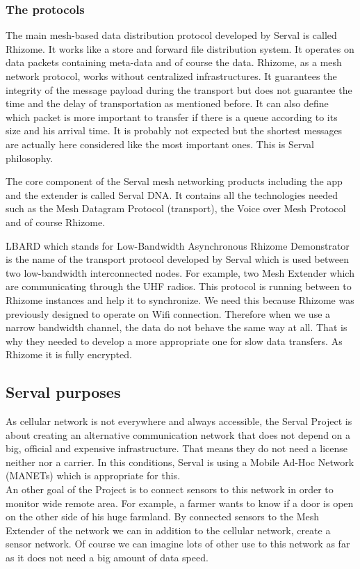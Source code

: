 \subsubsection{The protocols}

\par
The main mesh-based data distribution protocol developed by Serval is called Rhizome. It works like a store and forward file distribution system. It operates on data packets containing meta-data and of course the data. Rhizome, as a mesh network protocol, works without centralized infrastructures. It guarantees the integrity of the message payload during the transport but does not guarantee the time and the delay of transportation as mentioned before. It can also define which packet is more important to transfer if there is a queue according to its size and his arrival time. It is probably not expected but the shortest messages are actually here considered like the most important ones. This is Serval philosophy. 

\par
The core component of the Serval mesh networking products including the app and the extender is called Serval DNA. It contains all the technologies needed such as the Mesh Datagram Protocol (transport), the Voice over Mesh Protocol and of course Rhizome. 

\par
LBARD which stands for Low-Bandwidth Asynchronous Rhizome Demonstrator is the name of the transport protocol developed by Serval which is used between two low-bandwidth interconnected nodes. For example, two Mesh Extender which are communicating through the UHF radios. This protocol is running between to Rhizome instances and help it to synchronize. We need this because Rhizome was previously designed to operate on Wifi connection. Therefore when we use a narrow bandwidth channel, the data do not behave the same way at all.  That is why they needed to develop a more appropriate one for slow data transfers. As Rhizome it is fully encrypted.

\subsection{Serval purposes}
As cellular network is not everywhere and always accessible, the Serval Project is about creating an alternative communication network that does not depend on a big, official and expensive infrastructure. That means they do not need a license neither nor a carrier. In this conditions, Serval is using a Mobile Ad-Hoc Network (MANETs) which is appropriate for this. \\
An other goal of the Project is to connect sensors to this network in order to monitor wide remote area. For example, a farmer wants to know if a door is open on the other side of his huge farmland. By connected sensors to the Mesh Extender of the network we can in addition to the cellular network, create a sensor network. Of course we can imagine lots of other use to this network as far as it does not need a big amount of data speed. 

